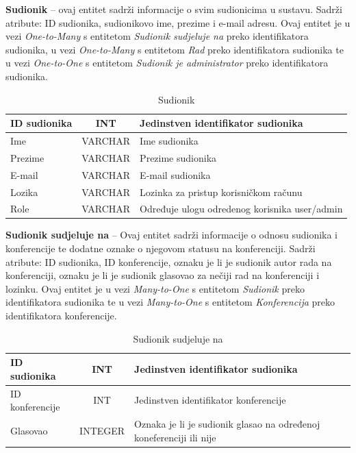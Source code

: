 \textbf{Sudionik} – ovaj entitet sadrži informacije o svim sudionicima u sustavu. Sadrži atribute: ID sudionika, sudionikovo ime, prezime i e-mail adresu. Ovaj entitet je u vezi \textit{One-to-Many} s entitetom \textit{Sudionik sudjeluje na} preko identifikatora sudionika, u vezi \textit{One-to-Many} s entitetom \textit{Rad} preko identifikatora sudionika te u vezi \textit{One-to-One} s entitetom \textit{Sudionik je administrator} preko identifikatora sudionika.

\begin{table}[H]
	\caption{Sudionik}
	\label{tbl:sudionik}
	\centering
	\begin{tabular}{|l|c|l|} 
		\hline
		\cellcolor{lightgreen}ID sudionika & INT & Jedinstven identifikator sudionika\\ 
		\hline
		Ime & VARCHAR & Ime sudionika\\ 
		\hline
		Prezime & VARCHAR & Prezime sudionika\\ 
		\hline
		E-mail & VARCHAR & E-mail sudionika\\ 
		\hline
		Lozika & VARCHAR & Lozinka za pristup korisničkom računu\\ 
		\hline
		Role & VARCHAR & Određuje ulogu odredenog korisnika user/admin\\ 
		\hline
	\end{tabular}
\end{table}

\textbf{Sudionik sudjeluje na} – Ovaj entitet sadrži informacije o odnosu sudionika i konferencije te dodatne oznake o njegovom statusu na konferenciji. Sadrži atribute: ID sudionika, ID konferencije, oznaku je li je sudionik autor rada na konferenciji, oznaku je li je sudionik glasovao za nečiji rad na konferenciji i lozinku. Ovaj entitet je u vezi \textit{Many-to-One} s entitetom \textit{Sudionik} preko identifikatora sudionika te u vezi \textit{Many-to-One} s entitetom \textit{Konferencija} preko identifikatora konferencije.

\begin{table}[H]
	\caption{Sudionik sudjeluje na}
	\label{tbl:sudionikSudjelujeNa}
	\centering
	\begin{tabular}{|l|c|l|} 
		\hline
		\cellcolor{lightblue}ID sudionika & INT & Jedinstven identifikator sudionika\\ 
		\hline
		\cellcolor{lightblue}ID konferencije & INT & Jedinstven identifikator konferencije\\ 
		\hline
		Glasovao & INTEGER & Oznaka je li je sudionik glasao na određenoj koneferenciji ili nije\\ 
		\hline
	\end{tabular}
\end{table}

